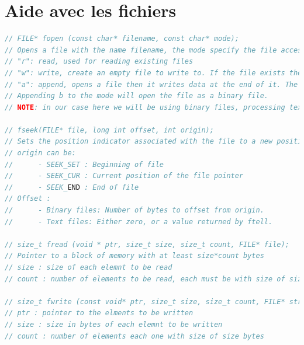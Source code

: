 \documentclass[a4paper]{article}
\begin{document}
	\section*{Aide avec les fichiers}
	\begin{lstlisting}[language=C]
// FILE* fopen (const char* filename, const char* mode);
// Opens a file with the name filename, the mode specify the file access mode. It can be:
// "r": read, used for reading existing files
// "w": write, create an empty file to write to. If the file exists then its content is overwritten
// "a": append, opens a file then it writes data at the end of it. The file is created if it does not exist
// Appending b to the mode will open the file as a binary file. 
// NOTE: in our case here we will be using binary files, processing text files isn't that different.

// fseek(FILE* file, long int offset, int origin);
// Sets the position indicator associated with the file to a new position.
// origin can be:
// 		- SEEK_SET : Beginning of file
// 		- SEEK_CUR : Current position of the file pointer
//	    - SEEK_END : End of file
// Offset :
// 		- Binary files: Number of bytes to offset from origin.
// 		- Text files: Either zero, or a value returned by ftell.

// size_t fread (void * ptr, size_t size, size_t count, FILE* file);
// Pointer to a block of memory with at least size*count bytes
// size : size of each elemnt to be read
// count : number of elements to be read, each must be with size of size bytes

// size_t fwrite (const void* ptr, size_t size, size_t count, FILE* stream);
// ptr : pointer to the elments to be written
// size : size in bytes of each elemnt to be written
// count : number of elements each one with size of size bytes
	\end{lstlisting}
\end{document}
